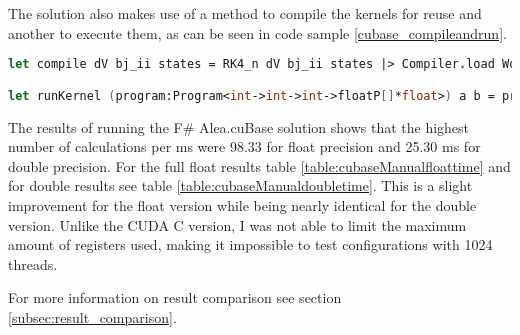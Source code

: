The solution also makes use of a method to compile the kernels for reuse and another to execute them, as can be seen in code sample \ref{cubase_compileandrun}. 

\begin{lstlisting}[language=FSharp, caption=Kernel compilation and execution methods in F\# Alea.cuBase, label=cubase_compileandrun]
let compile dV bj_ii states = RK4_n dV bj_ii states |> Compiler.load Worker.Default

let runKernel (program:Program<int->int->int->floatP[]*float>) a b = program.Run a b steps
\end{lstlisting}

The results of running the F\# Alea.cuBase solution shows that the highest number of calculations per ms were 98.33 for float precision and 25.30 ms for double precision.
For the full float results table \ref{table:cubaseManualfloattime} and for double results see table \ref{table:cubaseManualdoubletime}.
This is a slight improvement for the float version while being nearly identical for the double version.
Unlike the CUDA C version, I was not able to limit the maximum amount of registers used, making  it impossible to test configurations with 1024 threads.

For more information on result comparison see section \ref{subsec:result_comparison}.

\begin{table}[h!]
\centering
{}
\caption{F\# Alea.cuBase calculations per ms with float precision\label{table:cubaseManualfloattime}}
\end{table}

